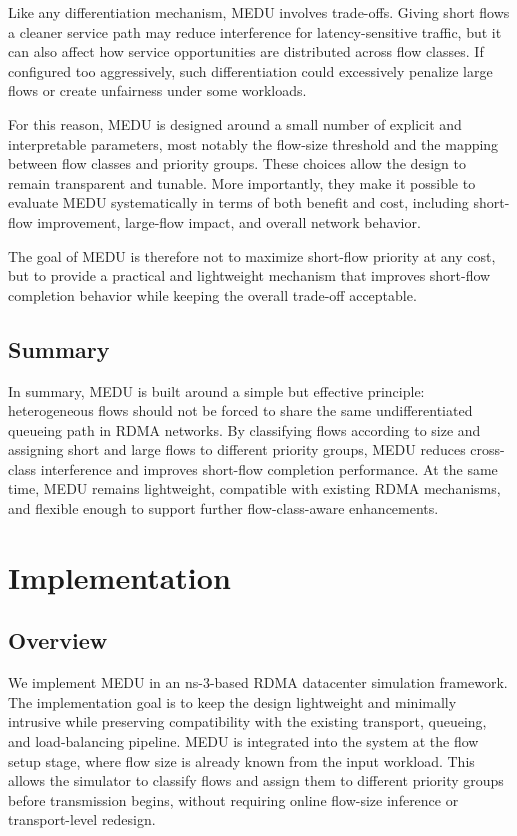 \documentclass[conference]{IEEEtran}
\begin{document}
Like any differentiation mechanism, MEDU involves trade-offs. Giving short flows a cleaner service path may reduce interference for latency-sensitive traffic, but it can also affect how service opportunities are distributed across flow classes. If configured too aggressively, such differentiation could excessively penalize large flows or create unfairness under some workloads.

For this reason, MEDU is designed around a small number of explicit and interpretable parameters, most notably the flow-size threshold and the mapping between flow classes and priority groups. These choices allow the design to remain transparent and tunable. More importantly, they make it possible to evaluate MEDU systematically in terms of both benefit and cost, including short-flow improvement, large-flow impact, and overall network behavior.

The goal of MEDU is therefore not to maximize short-flow priority at any cost, but to provide a practical and lightweight mechanism that improves short-flow completion behavior while keeping the overall trade-off acceptable.

\subsection{Summary}

In summary, MEDU is built around a simple but effective principle: heterogeneous flows should not be forced to share the same undifferentiated queueing path in RDMA networks. By classifying flows according to size and assigning short and large flows to different priority groups, MEDU reduces cross-class interference and improves short-flow completion performance. At the same time, MEDU remains lightweight, compatible with existing RDMA mechanisms, and flexible enough to support further flow-class-aware enhancements.

\section{Implementation}

\subsection{Overview}

We implement MEDU in an ns-3-based RDMA datacenter simulation framework. The implementation goal is to keep the design lightweight and minimally intrusive while preserving compatibility with the existing transport, queueing, and load-balancing pipeline. MEDU is integrated into the system at the flow setup stage, where flow size is already known from the input workload. This allows the simulator to classify flows and assign them to different priority groups before transmission begins, without requiring online flow-size inference or transport-level redesign.
\end{document}
